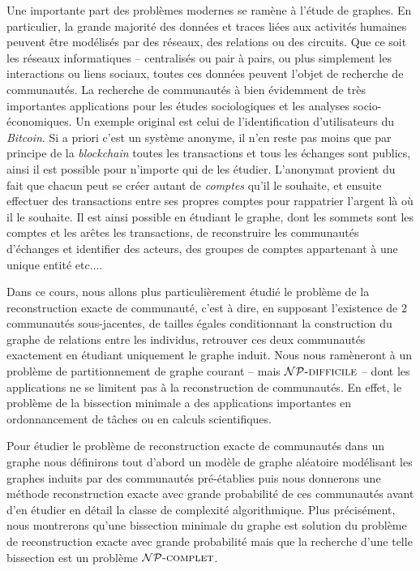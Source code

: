\documentclass{standalone}
\begin{document}
Une importante part des problèmes modernes se ramène à l'étude de graphes. En particulier, la grande majorité des données et traces liées aux activités humaines peuvent être modélisés par des réseaux, des relations ou des circuits. Que ce soit les réseaux informatiques -- centralisés ou pair à pairs, ou plus simplement les interactions ou liens sociaux, toutes ces données peuvent l'objet de recherche de communautés. La recherche de communautés à bien évidemment de très importantes applications pour les études sociologiques et les analyses socio-économiques. Un exemple original est celui de l'identification d'utilisateurs du \emph{Bitcoin}. Si a priori c'est un système anonyme, il n'en reste pas moins que par principe de la \emph{blockchain} toutes les transactions et tous les échanges sont publics, ainsi il est possible pour n'importe qui de les étudier. L'anonymat provient du fait que chacun peut se créer autant de \textit{comptes} qu'il le souhaite, et ensuite effectuer des transactions entre ses propres comptes pour rappatrier l'argent là où il le souhaite. Il est ainsi possible en étudiant le graphe, dont les sommets sont les comptes et les arêtes les transactions, de reconstruire les communautés d'échanges et identifier des acteurs, des groupes de comptes appartenant à une unique entité etc...\cite{bitcoin}.

Dans ce cours, nous allons plus particulièrement étudié le problème de la reconstruction exacte de communauté\cite{dyier}, c'est à dire, en supposant l'existence de 2 communautés sous-jacentes, de tailles égales conditionnant la construction du graphe de relations entre les individus, retrouver ces deux communautés exactement en étudiant uniquement le graphe induit. Nous nous ramèneront à un problème de partitionnement de graphe courant -- mais $\mathcal{NP}\text{\textsc{-difficile}}$ -- dont les applications ne se limitent pas à la reconstruction de communautés. En effet, le problème de la bissection minimale a des applications importantes en ordonnancement de tâches ou en calculs scientifiques\cite{applications}.

Pour étudier le problème de reconstruction exacte de communautés dans un graphe nous définirons tout d'abord un modèle de graphe aléatoire modélisant les graphes induits par des communautés pré-établies puis nous donnerons une méthode reconstruction exacte avec grande probabilité de ces communautés avant d'en étudier en détail la classe de complexité algorithmique. Plus précisément, nous montrerons qu'une bissection minimale du graphe est solution du problème de reconstruction exacte avec grande probabilité mais que la recherche d'une telle bissection est un problème $\mathcal{NP}\text{\textsc{-complet}}$.
	
\end{document}
